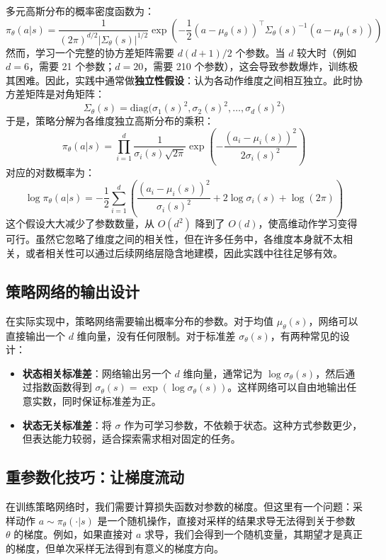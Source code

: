 \documentclass[lang=cn,zihao=-4,a4paper,fontset=windows]{beautybook}
\begin{document}
多元高斯分布的概率密度函数为：
\[
\pi_\theta(a|s) = \frac{1}{(2\pi)^{d/2} |\Sigma_\theta(s)|^{1/2}} \exp\left(-\frac{1}{2} (a - \mu_\theta(s))^\top \Sigma_\theta(s)^{-1} (a - \mu_\theta(s))\right)
\]
然而，学习一个完整的协方差矩阵需要 $d(d+1)/2$ 个参数。当 $d$ 较大时（例如 $d=6$，需要 21 个参数；$d=20$，需要 210 个参数），这会导致参数爆炸，训练极其困难。因此，实践中通常做\textbf{独立性假设}：认为各动作维度之间相互独立。此时协方差矩阵是对角矩阵：
\[
\Sigma_\theta(s) = \text{diag}\big(\sigma_1(s)^2, \sigma_2(s)^2, \dots, \sigma_d(s)^2\big)
\]
于是，策略分解为各维度独立高斯分布的乘积：
\[
\pi_\theta(a|s) = \prod_{i=1}^d \frac{1}{\sigma_i(s)\sqrt{2\pi}} \exp\left(-\frac{(a_i-\mu_i(s))^2}{2\sigma_i(s)^2}\right)
\]
对应的对数概率为：
\[
\log \pi_\theta(a|s) = -\frac{1}{2}\sum_{i=1}^d \left( \frac{(a_i-\mu_i(s))^2}{\sigma_i(s)^2} + 2\log\sigma_i(s) + \log(2\pi) \right)
\]
这个假设大大减少了参数数量，从 $O(d^2)$ 降到了 $O(d)$，使高维动作学习变得可行。虽然它忽略了维度之间的相关性，但在许多任务中，各维度本身就不太相关，或者相关性可以通过后续网络层隐含地建模，因此实践中往往足够有效。

\subsection{策略网络的输出设计}

在实际实现中，策略网络需要输出概率分布的参数。对于均值 $\mu_\theta(s)$，网络可以直接输出一个 $d$ 维向量，没有任何限制。对于标准差 $\sigma_\theta(s)$，有两种常见的设计：
\begin{itemize}
    \item \textbf{状态相关标准差}：网络输出另一个 $d$ 维向量，通常记为 $\log \sigma_\theta(s)$，然后通过指数函数得到 $\sigma_\theta(s) = \exp(\log \sigma_\theta(s))$。这样网络可以自由地输出任意实数，同时保证标准差为正。
    \item \textbf{状态无关标准差}：将 $\sigma$ 作为可学习参数，不依赖于状态。这种方式参数更少，但表达能力较弱，适合探索需求相对固定的任务。
\end{itemize}

\subsection{重参数化技巧：让梯度流动}

在训练策略网络时，我们需要计算损失函数对参数的梯度。但这里有一个问题：采样动作 $a \sim \pi_\theta(\cdot|s)$ 是一个随机操作，直接对采样的结果求导无法得到关于参数 $\theta$ 的梯度。例如，如果直接对 $a$ 求导，我们会得到一个随机变量，其期望才是真正的梯度，但单次采样无法得到有意义的梯度方向。
\end{document}
